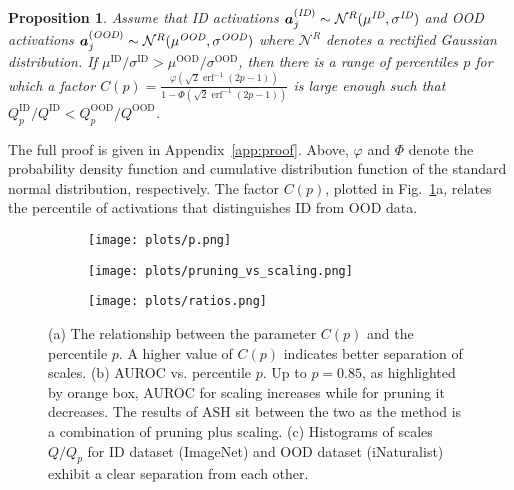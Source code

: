 \documentclass{article} %
\theoremstyle{plain}
\newtheorem{proposition}[theorem]{Proposition}
\newcommand{\pF}{\va}     %
\begin{document}
\begin{proposition}
\label{prop_ratio}
Assume that ID activations $\pF_j^{(\textit{ID})} \sim \mathcal{N}^{R}(\mu^{\textit{ID}}, \sigma^{\textit{ID}})$ and OOD activations $\pF_j^{(\textit{OOD})} \sim \mathcal{N}^{R}(\mu^{\textit{OOD}}, \sigma^{\textit{OOD}})$ where $\mathcal{N}^{R}$ denotes a rectified Gaussian distribution. 
If $\mu^\text{ID}/\sigma^\text{ID}>\mu^\text{OOD}/\sigma^\text{OOD}$, then there is a range of percentiles $p$
for which a factor $ C(p)=\frac{\varphi(\sqrt{2}\operatorname {erf} ^{-1}(2p-1))}{1-\Phi(\sqrt{2}\operatorname {erf} ^{-1}(2p-1))}$ is large enough such that ${Q_p^{\text{ID}}}/{Q^{\text{ID}}}<{Q_p^{\text{OOD}}}/{Q^{\text{OOD}}}$. 
\end{proposition}

The full proof is given in Appendix~\ref{app:proof}. Above, $\varphi$ and $\Phi$ denote the probability density function and cumulative distribution function of the standard normal distribution, respectively.  The factor $C(p)$, plotted in Fig.~\ref{fig:percentile}a, relates the percentile of activations that distinguishes ID from OOD data.


\begin{figure}[t!]
  \centering

  \begin{subfigure}{0.31\textwidth}
    \texttt{[image: plots/p.png]}
  \end{subfigure}\hfil
  \begin{subfigure}{0.33\textwidth}
  
    \texttt{[image: plots/pruning\_vs\_scaling.png]}
  \end{subfigure}\hfil
  \begin{subfigure}{0.33\textwidth}
    \vspace{1em}
    \texttt{[image: plots/ratios.png]}
  \end{subfigure}
  
  \caption{(a) 
  The relationship between the parameter $C(p)$ and the percentile $p$. A higher value of $C(p)$ indicates better separation of scales. (b) AUROC vs. percentile $p$. Up to $p=0.85$, as highlighted by orange box, AUROC for scaling increases while for pruning it decreases. The results of ASH sit between the two as the method is a combination of pruning plus scaling. (c) Histograms of scales $Q/Q_p$ for ID dataset (ImageNet) and  OOD dataset (iNaturalist) exhibit a clear separation from each other. }
  \label{fig:percentile}
\end{figure}
\end{document}
